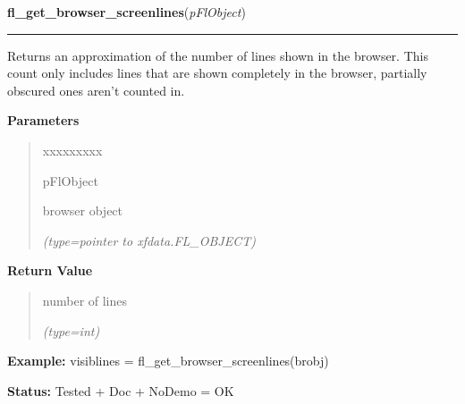 \hspace{.8\funcindent}\begin{boxedminipage}{\funcwidth}

    \raggedright \textbf{fl\_get\_browser\_screenlines}(\textit{pFlObject})

    \vspace{-1.5ex}

    \rule{\textwidth}{0.5\fboxrule}
\setlength{\parskip}{2ex}
    Returns an approximation of the number of lines shown in the browser. 
    This count only includes lines that are shown completely in the 
    browser, partially obscured ones aren't counted in.

\setlength{\parskip}{1ex}
      \textbf{Parameters}
      \vspace{-1ex}

      \begin{quote}
        \begin{Ventry}{xxxxxxxxx}

          \item[pFlObject]

          browser object

            {\it (type=pointer to xfdata.FL\_OBJECT)}

        \end{Ventry}

      \end{quote}

      \textbf{Return Value}
    \vspace{-1ex}

      \begin{quote}
      number of lines

      {\it (type=int)}

      \end{quote}

\textbf{Example:} visiblines = fl\_get\_browser\_screenlines(brobj)



\textbf{Status:} Tested + Doc + NoDemo = OK



    \end{boxedminipage}

    \label{xformslib:flbrowser:fl_set_browser_topline}

    \vspace{0.5ex}

